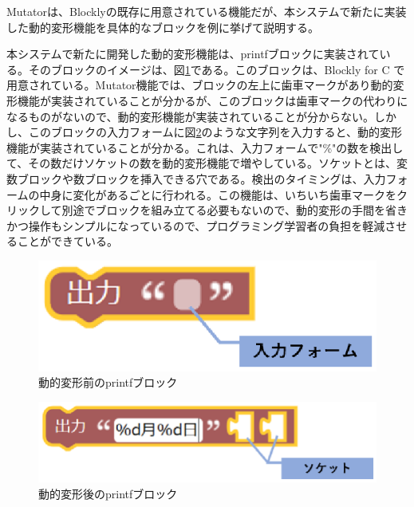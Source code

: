 \documentclass{risepaper}
\begin{document}
Mutatorは、Blocklyの既存に用意されている機能だが、本システムで新たに実装した動的変形機能を具体的なブロックを例に挙げて説明する。

本システムで新たに開発した動的変形機能は、printfブロックに実装されている。そのブロックのイメージは、図\ref{fig:output}である。このブロックは、Blockly for C で用意されている。Mutator機能では、ブロックの左上に歯車マークがあり動的変形機能が実装されていることが分かるが、このブロックは歯車マークの代わりになるものがないので、動的変形機能が実装されていることが分からない。しかし、このブロックの入力フォームに図\ref{fig:output2}のような文字列を入力すると、動的変形機能が実装されていることが分かる。これは、入力フォームで"\%"の数を検出して、その数だけソケットの数を動的変形機能で増やしている。ソケットとは、変数ブロックや数ブロックを挿入できる穴である。検出のタイミングは、入力フォームの中身に変化があるごとに行われる。この機能は、いちいち歯車マークをクリックして別途でブロックを組み立てる必要もないので、動的変形の手間を省きかつ操作もシンプルになっているので、プログラミング学習者の負担を軽減させることができている。

\begin{figure}[h]
\begin{center}
\includegraphics[scale=0.5]{img/output.eps}
\caption{動的変形前のprintfブロック}%
\label{fig:output}
\end{center}%
\end{figure}%

\begin{figure}[h]
\begin{center}
\includegraphics[scale=0.5]{img/output2.eps}
\caption{動的変形後のprintfブロック}%
\label{fig:output2}
\end{center}%
\end{figure}%
\end{document}
